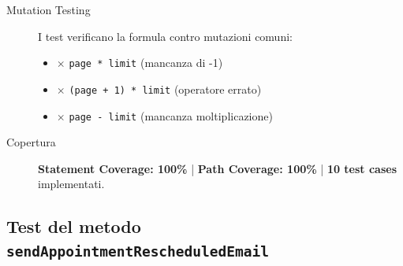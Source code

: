\begin{description}
    \item[Mutation Testing] I test verificano la formula contro mutazioni comuni:
    \begin{itemize}
        \item $\times$ \texttt{page * limit} (mancanza di -1)
        \item $\times$ \texttt{(page + 1) * limit} (operatore errato)
        \item $\times$ \texttt{page - limit} (mancanza moltiplicazione)
    \end{itemize}
    
    \item[Copertura] \textbf{Statement Coverage: 100\%} | \textbf{Path Coverage: 100\%} | \textbf{10 test cases} implementati.
\end{description}

\subsection{Test del metodo \texttt{sendAppointmentRescheduledEmail}}

